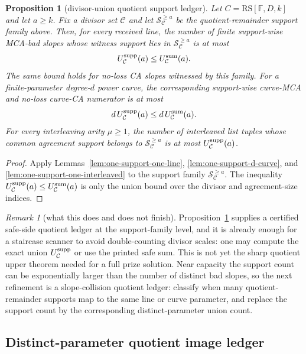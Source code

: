 \documentclass[11pt]{article}
\newtheorem{proposition}[theorem]{Proposition}
\theoremstyle{definition}
\theoremstyle{remark}
\newtheorem{remark}[theorem]{Remark}
\newcommand{\F}{\mathbb{F}}
\newcommand{\RS}{\mathrm{RS}}
\begin{document}
\begin{proposition}[divisor-union quotient support ledger]
\label{prop:divisor-union-support-ledger}
Let $C=\RS[\F,D,k]$ and let $a\ge k$.  Fix a divisor set $\mathcal C$ and let
$\mathcal S_{\mathcal C}^{\ge a}$ be the quotient-remainder support family above.
Then, for every received line, the number of finite support-wise MCA-bad slopes
whose witness support lies in $\mathcal S_{\mathcal C}^{\ge a}$ is at most
\[
        U_{\mathcal C}^{\rm supp}(a)
        \le U_{\mathcal C}^{\rm sum}(a).
\]
The same bound holds for no-loss CA slopes witnessed by this family.  For a
finite-parameter degree-$d$ power curve, the corresponding support-wise curve-MCA
and no-loss curve-CA numerator is at most
\[
        d\,U_{\mathcal C}^{\rm supp}(a)
        \le d\,U_{\mathcal C}^{\rm sum}(a).
\]
For every interleaving arity $\mu\ge1$, the number of interleaved list tuples whose
common agreement support belongs to $\mathcal S_{\mathcal C}^{\ge a}$ is at most
$U_{\mathcal C}^{\rm supp}(a)$.
\end{proposition}

\begin{proof}
Apply Lemmas~\ref{lem:one-support-one-line}, \ref{lem:one-support-d-curve}, and
\ref{lem:one-support-one-interleaved} to the support family
$\mathcal S_{\mathcal C}^{\ge a}$.  The inequality
$U_{\mathcal C}^{\rm supp}(a)\le U_{\mathcal C}^{\rm sum}(a)$ is only the union
bound over the divisor and agreement-size indices.
\end{proof}

\begin{remark}[what this does and does not finish]
\label{rem:quotient-upper-status}
Proposition~\ref{prop:divisor-union-support-ledger} supplies a certified
safe-side quotient ledger at the support-family level, and it is already enough
for a staircase scanner to avoid double-counting divisor scales: one may compute
the exact union $U_{\mathcal C}^{\rm supp}$ or use the printed safe sum.  This is
not yet the sharp quotient upper theorem needed for a full prize solution.  Near
capacity the support count can be exponentially larger than the number of
distinct bad slopes, so the next refinement is a slope-collision quotient ledger:
classify when many quotient-remainder supports map to the same line or curve
parameter, and replace the support count by the corresponding distinct-parameter
union count.
\end{remark}


\subsection{Distinct-parameter quotient image ledger}
\label{sec:quotient-distinct-parameter}
\end{document}
